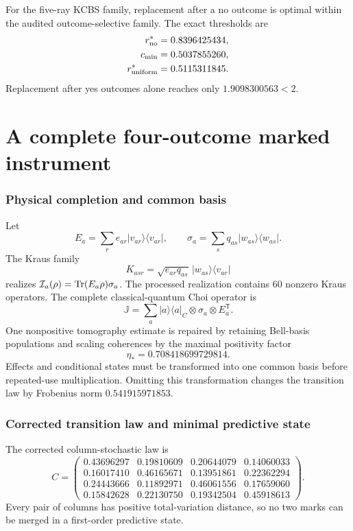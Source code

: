 \documentclass[11pt,a4paper]{article}
\begin{document}
For the five-ray KCBS family, replacement after a no outcome is optimal within the audited outcome-selective family. The exact thresholds are
\begin{align}
r_{\rm no}^*&=0.8396425434,\\
c_{\min}&=0.5037855260,\\
r_{\rm uniform}^*&=0.5115311845.
\end{align}
Replacement after yes outcomes alone reaches only $1.9098300563<2$.

\part{A complete four-outcome marked instrument}
\section{Physical completion and common basis}
Let
\begin{equation}
E_a=\sum_re_{ar}|v_{ar}\rangle\langle v_{ar}|,\qquad
\sigma_a=\sum_sq_{as}|w_{as}\rangle\langle w_{as}|.
\end{equation}
The Kraus family
\begin{equation}
K_{asr}=\sqrt{e_{ar}q_{as}}\,|w_{as}\rangle\langle v_{ar}|
\end{equation}
realizes $\mathcal I_a(\rho)=\operatorname{Tr}(E_a\rho)\sigma_a$. The processed realization contains 60 nonzero Kraus operators. The complete classical-quantum Choi operator is
\begin{equation}
\mathbb J=\sum_a|a\rangle\langle a|_C\otimes\sigma_a\otimes E_a^{\mathsf T}.
\end{equation}
One nonpositive tomography estimate is repaired by retaining Bell-basis populations and scaling coherences by the maximal positivity factor
\begin{equation}
\eta_*=0.708418699729814.
\end{equation}
Effects and conditional states must be transformed into one common basis before repeated-use multiplication. Omitting this transformation changes the transition law by Frobenius norm $0.541915971853$.

\section{Corrected transition law and minimal predictive state}
The corrected column-stochastic law is
\begin{equation}
C=\begin{pmatrix}
0.43696297&0.19810609&0.20644079&0.14060033\\
0.16017410&0.46165671&0.13951861&0.22362294\\
0.24443666&0.11892971&0.46061556&0.17659060\\
0.15842628&0.22130750&0.19342504&0.45918613
\end{pmatrix}.
\end{equation}
Every pair of columns has positive total-variation distance, so no two marks can be merged in a first-order predictive state.
\end{document}
